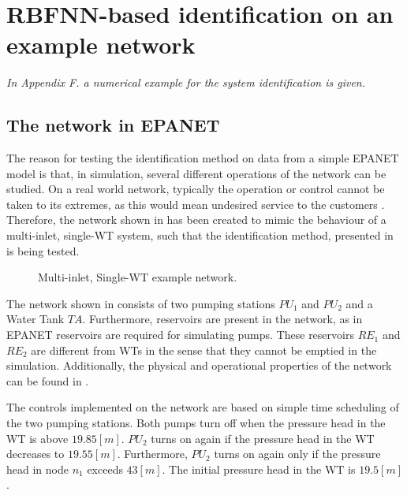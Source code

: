 \chapter{RBFNN-based identification on an example network}
\label{NN_based_example}

\emph{In Appendix F. a numerical example for the system identification is given. }

\section{The network in EPANET}
\label{example1_EPANET}

The reason for testing the identification method on data from a simple EPANET model is that, in simulation, several different operations of the network can be studied. On a real world network, typically the operation or control cannot be taken to its extremes, as this would mean undesired service to the customers . Therefore, the network shown in  has been created to mimic the behaviour of a multi-inlet, single-WT system, such that the identification method, presented in  is being tested. 

\begin{figure}[H]
\centering
 
\caption{Multi-inlet, Single-WT example network.}
\label{fig:epanet_example1_id}
\end{figure}
\vspace{-3mm}

The network shown in  consists of two pumping stations $PU_1$ and $PU_2$ and a Water Tank $TA$. Furthermore, reservoirs are present in the network, as in EPANET reservoirs are required for simulating pumps. These reservoirs $RE_1$ and $RE_2$ are different from WTs in the sense that they cannot be emptied in the simulation. Additionally, the physical and operational properties of the network can be found in . 

The controls implemented on the network are based on simple time scheduling of the two pumping stations. Both pumps turn off when the pressure head in the WT is above $19.85 [m]$. $PU_2$ turns on again if the pressure head in the WT decreases to $19.55 [m]$. Furthermore, $PU_2$ turns on again only if the pressure head in node $n_1$ exceeds $43 [m]$. The initial pressure head in the WT is $19.5 [m]$.

